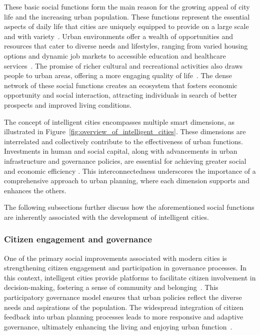 \documentclass[smartcities,article,submit,pdftex,moreauthors]{Definitions/mdpi}
\begin{document}
These basic social functions form the main reason for the growing appeal of city life and the increasing urban population. These functions represent the essential aspects of daily life that cities are uniquely equipped to provide on a large scale and with variety~\cite{SCDimensions}. Urban environments offer a wealth of opportunities and resources that cater to diverse needs and lifestyles, ranging from varied housing options and dynamic job markets to accessible education and healthcare services~\cite{SCQualityOfLife}. The promise of richer cultural and recreational activities also draws people to urban areas, offering a more engaging quality of life~\cite{SCHappiness}. The dense network of these social functions creates an ecosystem that fosters economic opportunity and social interaction, attracting individuals in search of better prospects and improved living conditions.

The concept of intelligent cities encompasses multiple smart dimensions, as illustrated in Figure~\ref{fig:overview_of_intelligent_cities}. These dimensions are interrelated and collectively contribute to the effectiveness of urban functions. Investments in human and social capital, along with advancements in urban infrastructure and governance policies, are essential for achieving greater social and economic efficiency \cite{TopDownGov1}. This interconnectedness underscores the importance of a comprehensive approach to urban planning, where each dimension supports and enhances the others.  

The following subsections further discuss how the aforementioned social functions are inherently associated with the development of intelligent cities. 

\subsubsection{Citizen engagement and governance}

One of the primary social improvements associated with modern cities is strengthening citizen engagement and participation in governance processes. In this context, intelligent cities provide platforms to facilitate citizen involvement in decision-making, fostering a sense of community and belonging~\cite{GenderEquitySC}. This participatory governance model ensures that urban policies reflect the diverse needs and aspirations of the population. The widespread integration of citizen feedback into urban planning processes leads to more responsive and adaptive governance, ultimately enhancing the living and enjoying urban function~\cite{CitizenParticipation}.  
\end{document}
